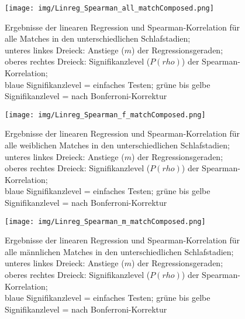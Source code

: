 
\begin{figure}[H]
	\centering
	\texttt{[image: img/Linreg\_Spearman\_all\_matchComposed.png]}
	\caption[Ergebnisse der linearen Regression und Spearman-Korrelation für alle Matches]{Ergebnisse der linearen Regression und Spearman-Korrelation für alle Matches in den unterschiedlichen Schlafstadien;\\unteres linkes Dreieck: Anstiege ($m$) der Regressionsgeraden;\\oberes rechtes Dreieck: Signifikanzlevel ($P(rho)$) der Spearman-Korrelation;\\blaue Signifikanzlevel = einfaches Testen; grüne bis gelbe Signifikanzlevel = nach Bonferroni-Korrektur}
	\label{fig:Linreg_Spearman_all_matchComposed}
\end{figure}



\begin{figure}[H]
	\centering
	\texttt{[image: img/Linreg\_Spearman\_f\_matchComposed.png]}
	\caption[Ergebnisse der linearen Regression und Spearman-Korrelation für alle weiblichen Matches]{Ergebnisse der linearen Regression und Spearman-Korrelation für alle weiblichen Matches in den unterschiedlichen Schlafstadien;\\unteres linkes Dreieck: Anstiege ($m$) der Regressionsgeraden;\\oberes rechtes Dreieck: Signifikanzlevel ($P(rho)$) der Spearman-Korrelation;\\blaue Signifikanzlevel = einfaches Testen; grüne bis gelbe Signifikanzlevel = nach Bonferroni-Korrektur}
	\label{fig:Linreg_Spearman_f_matchComposed}
\end{figure}




\begin{figure}[H]
	\centering
	\texttt{[image: img/Linreg\_Spearman\_m\_matchComposed.png]}
	\caption[Ergebnisse der linearen Regression und Spearman-Korrelation für alle männlichen Matches]{Ergebnisse der linearen Regression und Spearman-Korrelation für alle männlichen Matches in den unterschiedlichen Schlafstadien;\\unteres linkes Dreieck: Anstiege ($m$) der Regressionsgeraden;\\oberes rechtes Dreieck: Signifikanzlevel ($P(rho)$) der Spearman-Korrelation;\\blaue Signifikanzlevel = einfaches Testen; grüne bis gelbe Signifikanzlevel = nach Bonferroni-Korrektur}
	\label{fig:Linreg_Spearman_m_matchComposed}
\end{figure}









\restoregeometry